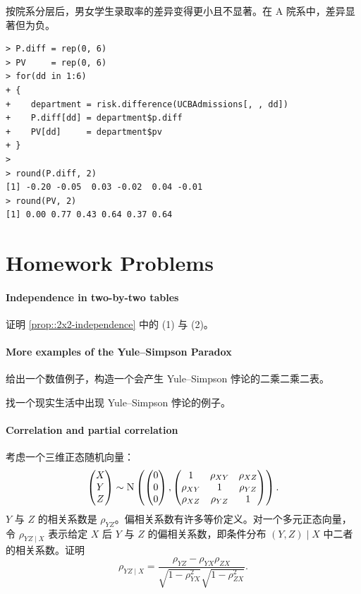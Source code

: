 按院系分层后，男女学生录取率的差异变得更小且不显著。在 A 院系中，差异显著但为负。
\begin{lstlisting}
> P.diff = rep(0, 6)
> PV     = rep(0, 6)
> for(dd in 1:6)
+ {
+ 	 department = risk.difference(UCBAdmissions[, , dd])
+ 	 P.diff[dd] = department$p.diff
+ 	 PV[dd]     = department$pv
+ }
>
> round(P.diff, 2)
[1] -0.20 -0.05  0.03 -0.02  0.04 -0.01
> round(PV, 2)
[1] 0.00 0.77 0.43 0.64 0.37 0.64
\end{lstlisting}

\section{Homework Problems}

\paragraph{Independence in two-by-two tables}\label{hw::2x2-equivalence}

证明 \cref{prop::2x2-independence} 中的 (1) 与 (2)。

\paragraph{More examples of the Yule--Simpson Paradox}

给出一个数值例子，构造一个会产生 Yule--Simpson 悖论的二乘二乘二表。

找一个现实生活中出现 Yule--Simpson 悖论的例子。

\paragraph{Correlation and partial correlation}\label{hw::partial-correlation}

考虑一个三维正态随机向量：
\[
\begin{pmatrix}
X\\
Y\\
Z
\end{pmatrix}
\sim
\textsc{N}
\left(
\begin{pmatrix}
0\\
0\\
0
\end{pmatrix},
\begin{pmatrix}
1 & \rho_{XY} & \rho_{XZ}\\
\rho_{XY} & 1 & \rho_{YZ}\\
\rho_{XZ} & \rho_{YZ} & 1
\end{pmatrix}
\right).
\]
$Y$ 与 $Z$ 的相关系数是 $\rho_{YZ}$。偏相关系数有许多等价定义。对一个多元正态向量，令 $\rho_{YZ\mid X}$ 表示给定 $X$ 后 $Y$ 与 $Z$ 的偏相关系数，即条件分布 $(Y,Z)\mid X$ 中二者的相关系数。证明
\[
\rho_{YZ\mid X}
=
\frac{\rho_{YZ}-\rho_{YX}\rho_{ZX}}
{\sqrt{1-\rho_{YX}^2}\sqrt{1-\rho_{ZX}^2}} .
\]

